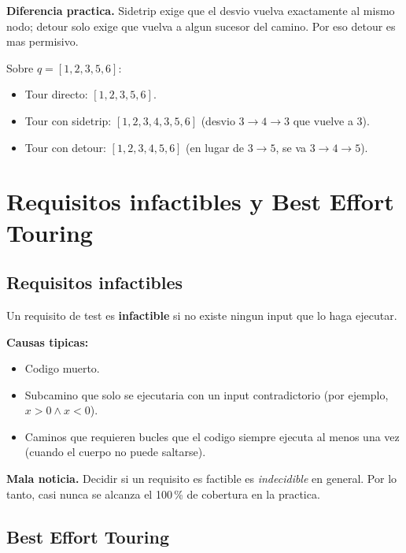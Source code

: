 \documentclass[12pt,a4paper]{article}
\begin{document}
\textbf{Diferencia practica.} Sidetrip exige que el desvio vuelva exactamente al mismo nodo;
detour solo exige que vuelva a algun sucesor del camino. Por eso detour es mas permisivo.

\begin{ejemplobox}
Sobre $q = [1, 2, 3, 5, 6]$:
\begin{itemize}
  \item Tour directo: $[1, 2, 3, 5, 6]$.
  \item Tour con sidetrip: $[1, 2, 3, 4, 3, 5, 6]$ (desvio $3 \to 4 \to 3$ que vuelve a 3).
  \item Tour con detour: $[1, 2, 3, 4, 5, 6]$ (en lugar de $3 \to 5$, se va $3 \to 4 \to 5$).
\end{itemize}
\end{ejemplobox}

\section{Requisitos infactibles y Best Effort Touring}

\subsection{Requisitos infactibles}

\begin{definicionbox}
Un requisito de test es \textbf{infactible} si no existe ningun input que lo haga ejecutar.
\end{definicionbox}

\textbf{Causas tipicas:}
\begin{itemize}
  \item Codigo muerto.
  \item Subcamino que solo se ejecutaria con un input contradictorio (por ejemplo, $x > 0 \land x
  < 0$).
  \item Caminos que requieren bucles que el codigo siempre ejecuta al menos una vez (cuando el
  cuerpo no puede saltarse).
\end{itemize}

\textbf{Mala noticia.} Decidir si un requisito es factible es \emph{indecidible} en general. Por
lo tanto, casi nunca se alcanza el 100\,\% de cobertura en la practica.

\subsection{Best Effort Touring}
\end{document}
